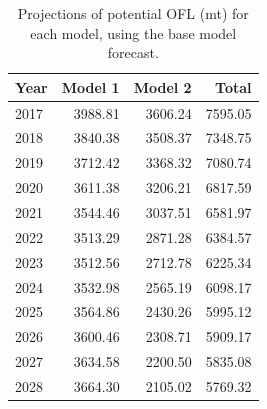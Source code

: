 \documentclass[12pt,]{article}
\begin{document}
\begin{table}[ht]
\centering
\caption{Projections of potential OFL (mt) for each model, using the base model forecast.} 
\label{tab:OFL_projection}
\begin{tabular}{lrrr}
  \hline
Year & Model 1 & Model 2 & Total \\ 
  \hline
2017 & 3988.81 & 3606.24 & 7595.05 \\ 
  2018 & 3840.38 & 3508.37 & 7348.75 \\ 
  2019 & 3712.42 & 3368.32 & 7080.74 \\ 
  2020 & 3611.38 & 3206.21 & 6817.59 \\ 
  2021 & 3544.46 & 3037.51 & 6581.97 \\ 
  2022 & 3513.29 & 2871.28 & 6384.57 \\ 
  2023 & 3512.56 & 2712.78 & 6225.34 \\ 
  2024 & 3532.98 & 2565.19 & 6098.17 \\ 
  2025 & 3564.86 & 2430.26 & 5995.12 \\ 
  2026 & 3600.46 & 2308.71 & 5909.17 \\ 
  2027 & 3634.58 & 2200.50 & 5835.08 \\ 
  2028 & 3664.30 & 2105.02 & 5769.32 \\ 
   \hline
\end{tabular}
\end{table}\begin{table}[ht]
\centering
\caption{Summary of 10-year 
                                             projections beginning in 2018 
                                             for alternate states of nature based on 
                                             an axis of uncertainty for the Northern model.  Columns range over low, mid, and high
                                             states of nature, and rows range over different 
                                             assumptions of catch levels. An entry of "--" 
                                             indicates that the stock is driven to very low 
                                             abundance under the particular scenario.} 
\label{tab:Decision_table_mod1}
\end{table}
\end{document}
